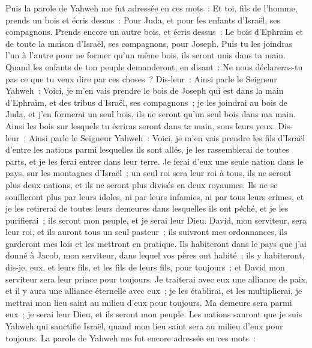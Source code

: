 \begin{multicols}{2}
Puis la parole de Yahweh me fut adressée en ces mots~:
Et toi, fils de l'homme, prends un bois et écris dessus~: Pour Juda, et pour les enfants d'Israël, ses compagnons. Prends encore un autre bois, et écris dessus~: Le bois d'Ephraïm et de toute la maison d'Israël, ses compagnons, pour Joseph.
Puis tu les joindras l'un à l'autre pour ne former qu'un même bois, ils seront unis dans ta main.
Quand les enfants de ton peuple demanderont, en disant~: Ne nous déclareras-tu pas ce que tu veux dire par ces choses~?
Dis-leur~: Ainsi parle le Seigneur Yahweh~: Voici, je m'en vais prendre le bois de Joseph qui est dans la main d'Ephraïm, et des tribus d'Israël, ses compagnons~; je les joindrai au bois de Juda, et j'en formerai un seul bois, ils ne seront qu'un seul bois dans ma main.
Ainsi les bois sur lesquels tu écriras seront dans ta main, sous leurs yeux.
Dis-leur~: Ainsi parle le Seigneur Yahweh~: Voici, je m'en vais prendre les fils d'Israël d'entre les nations parmi lesquelles ils sont allés, je les rassemblerai de toutes parts, et je les ferai entrer dans leur terre.
Je ferai d'eux une seule nation dans le pays, sur les montagnes d'Israël~; un seul roi sera leur roi à tous, ils ne seront plus deux nations, et ils ne seront plus divisés en deux royaumes.
Ils ne se souilleront plus par leurs idoles, ni par leurs infamies, ni par tous leurs crimes, et je les retirerai de toutes leurs demeures dans lesquelles ils ont péché, et je les purifierai~; ils seront mon peuple, et je serai leur Dieu.
David, mon serviteur, sera leur roi, et ils auront tous un seul pasteur~; ils suivront mes ordonnances, ils garderont mes lois et les mettront en pratique.
Ils habiteront dans le pays que j'ai donné à Jacob, mon serviteur, dans lequel vos pères ont habité~; ils y habiteront, dis-je, eux, et leurs fils, et les fils de leurs fils, pour toujours~; et David mon serviteur sera leur prince pour toujours.
Je traiterai avec eux une alliance de paix, et il y aura une alliance éternelle avec eux~; je les établirai, et les multiplierai, je mettrai mon lieu saint au milieu d'eux pour toujours.
Ma demeure sera parmi eux~; je serai leur Dieu, et ils seront mon peuple.
Les nations sauront que je suis Yahweh qui sanctifie Israël, quand mon lieu saint sera au milieu d'eux pour toujours.
\VerseOne{}La parole de Yahweh me fut encore adressée en ces mots~:

\end{multicols}

